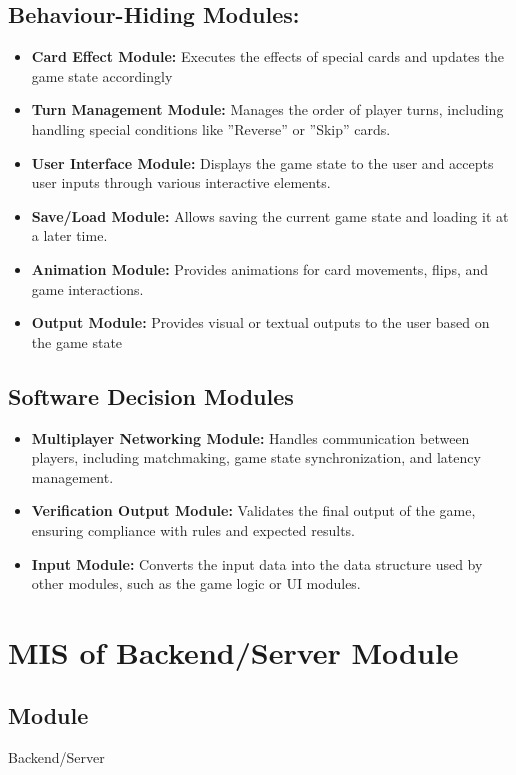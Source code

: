 \documentclass[12pt, titlepage]{article}
\begin{document}
\subsection{Behaviour-Hiding Modules:} 

\begin{itemize}
\item \textbf{Card Effect Module:} Executes the effects of special cards and updates the game state accordingly
\item \textbf{Turn Management Module:} Manages the order of player turns, including handling special conditions like ”Reverse” or ”Skip” cards.
\item \textbf{User Interface Module:} Displays the game state to the user and accepts user inputs through various interactive elements.
\item \textbf{Save/Load Module:} Allows saving the current game state and loading it at a later time.
\item \textbf{Animation Module:} Provides animations for card movements, flips, and game interactions.
\item \textbf{Output Module:} Provides visual or textual outputs to the user based on the game state
\end{itemize}

\subsection{Software Decision Modules}

\begin{itemize}
\item \textbf{Multiplayer Networking Module:} Handles communication between players, including matchmaking, game state synchronization, and latency management.
\item \textbf{Verification Output Module:} Validates the final output of the game, ensuring compliance with rules and expected results.
\item \textbf{Input Module:} Converts the input data into the data structure used by other modules, such as the game logic or UI modules.
\end{itemize}


\section{MIS of Backend/Server Module} 

\subsection{Module}
\hspace{1.5em}Backend/Server
\end{document}
